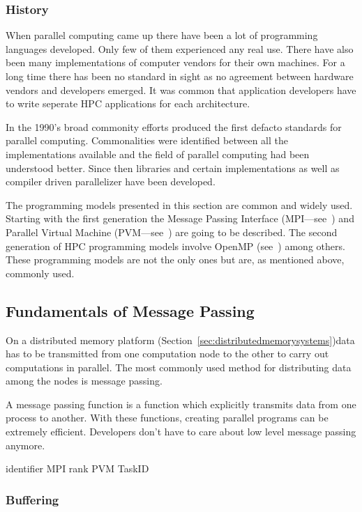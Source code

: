 \subsubsection{History}
When parallel computing came up there have been a lot of programming
languages developed. Only few of them experienced any real use. There
have also been many implementations of computer vendors for their own
machines. For a long time there has been no standard in sight as no
agreement between hardware vendors and developers emerged. It was
common that application developers have to write seperate HPC
applications for each architecture.

In the 1990's broad commonity efforts produced the first defacto
standards for parallel computing. Commonalities were identified
between all the implementations available and the field of parallel
computing had been understood better. Since then libraries and certain
implementations as well as compiler driven parallelizer have been
developed.


The programming models presented in this section are common and widely
used. Starting with the first generation the Message Passing Interface
(MPI---see~\cite{forum94:MPI}) and Parallel Virtual Machine
(PVM---see~\cite{geist94pvm})
are going to be described. The second generation of HPC programming
models involve OpenMP (see~\cite{openMP05}) among others. These
programming models are not the only ones 
but are, as mentioned above, commonly used. 

\subsection{Fundamentals of Message Passing}
\label{sec:messagepassing}

On a distributed memory platform
(Section~\ref{sec:distributedmemorysystems})data has to be transmitted
from one computation node to the other to carry out computations in
parallel. The most commonly used method for distributing data among
the nodes is message passing.
  
A message passing function is a function which explicitly transmits
data from one process to another. With these
functions, creating parallel programs can be extremely
efficient. Developers don't have to care about low level
message passing anymore.

identifier MPI rank PVM TaskID


\subsubsection{Buffering}

